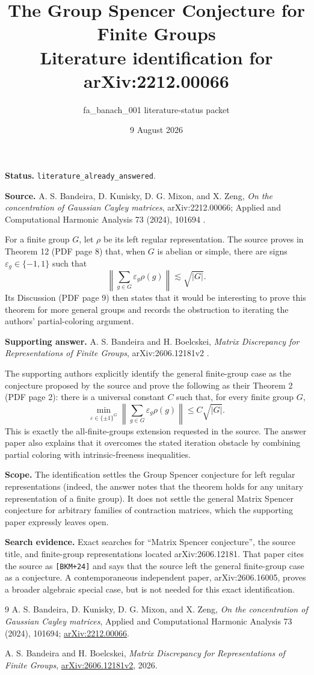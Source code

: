 \documentclass[11pt]{article}
\title{The Group Spencer Conjecture for Finite Groups\\
\large Literature identification for arXiv:2212.00066}
\author{fa\_banach\_001 literature-status packet}
\date{9 August 2026}
\begin{document}
\maketitle

\textbf{Status.} \texttt{literature\_already\_answered}.

\textbf{Source.} A. S. Bandeira, D. Kunisky, D. G. Mixon, and X. Zeng,
\emph{On the concentration of Gaussian Cayley matrices},
arXiv:2212.00066; Applied and Computational Harmonic Analysis 73 (2024),
101694 \cite{BKMZ}.

For a finite group $G$, let $\rho$ be its left regular representation.  The
source proves in Theorem 12 (PDF page 8) that, when $G$ is abelian or simple,
there are signs $\varepsilon_g\in\{-1,1\}$ such that
\[
  \left\|\sum_{g\in G}\varepsilon_g\rho(g)\right\|
  \lesssim \sqrt{|G|}.
\]
Its Discussion (PDF page 9) then states that it would be interesting to prove
this theorem for more general groups and records the obstruction to iterating
the authors' partial-coloring argument.

\textbf{Supporting answer.} A. S. Bandeira and H. Boelcskei,
\emph{Matrix Discrepancy for Representations of Finite Groups},
arXiv:2606.12181v2 \cite{BB}.

The supporting authors explicitly identify the general finite-group case as
the conjecture proposed by the source and prove the following as their
Theorem 2 (PDF page 2): there is a universal constant $C$ such that, for every
finite group $G$,
\[
  \min_{\varepsilon\in\{\pm1\}^{G}}
  \left\|\sum_{g\in G}\varepsilon_g\rho(g)\right\|
  \le C\sqrt{|G|}.
\]
This is exactly the all-finite-groups extension requested in the source.  The
answer paper also explains that it overcomes the stated iteration obstacle by
combining partial coloring with intrinsic-freeness inequalities.

\textbf{Scope.} The identification settles the Group Spencer conjecture for
left regular representations (indeed, the answer notes that the theorem holds
for any unitary representation of a finite group).  It does not settle the
general Matrix Spencer conjecture for arbitrary families of contraction
matrices, which the supporting paper expressly leaves open.

\textbf{Search evidence.} Exact searches for ``Matrix Spencer conjecture'',
the source title, and finite-group representations located arXiv:2606.12181.
That paper cites the source as \texttt{[BKM+24]} and says that the source left
the general finite-group case as a conjecture.  A contemporaneous independent
paper, arXiv:2606.16005, proves a broader algebraic special case, but is not
needed for this exact identification.

\begin{thebibliography}{9}
A. S. Bandeira, D. Kunisky, D. G. Mixon, and X. Zeng,
\emph{On the concentration of Gaussian Cayley matrices},
Applied and Computational Harmonic Analysis 73 (2024), 101694;
\href{https://arxiv.org/abs/2212.00066}{arXiv:2212.00066}.

A. S. Bandeira and H. Boelcskei,
\emph{Matrix Discrepancy for Representations of Finite Groups},
\href{https://arxiv.org/abs/2606.12181}{arXiv:2606.12181v2}, 2026.
\end{thebibliography}
\end{document}
